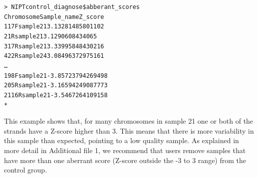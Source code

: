 \begin{alltt}
	\footnotesize 
\noindent\textgreater\ NIPTcontrol\_diagnose\$abberant\_scores \medskip\\
\indent Chromosome\hspace{4mm} Sample\_name \hspace{0mm} Z\_score \\
1 \baselineskip=4pt\hspace{1mm} 17F \hspace{11mm} sample21 \hspace{4mm} 3.13281485801102 \\
2 \baselineskip=4pt\hspace{1mm} 1R  \hspace{11mm} sample21 \hspace{4mm} 3.1290608434065 \\
3 \baselineskip=4pt\hspace{1mm} 17R \hspace{11mm} sample21 \hspace{4mm} 3.33995848430216 \\
4 \baselineskip=4pt\hspace{1mm} 22R \hspace{11mm} sample24 \hspace{4mm} 3.08496372975161 \\
… \\
19 \baselineskip=4pt\hspace{1mm}8F \hspace{11mm}  sample21 \hspace{4mm} -3.85723794269498 \\
20 \baselineskip=4pt\hspace{1mm}5R \hspace{11mm}  sample21 \hspace{4mm} -3.16594249087773 \\
21 \baselineskip=4pt\hspace{1mm}16R\hspace{11mm}  sample21 \hspace{4mm} -3.5467264109158 \\*
\end{alltt}



\noindent This example shows that, for many chromosomes in sample 21 one or both of the strands have a Z-score higher than 3. 
This means that there is more variability in this sample than expected, pointing to a low quality sample. 
As explained in more detail in Additional file 1, we recommend that users remove samples that have more than one aberrant score (Z-score outside the -3 to 3 range) from the control group.


